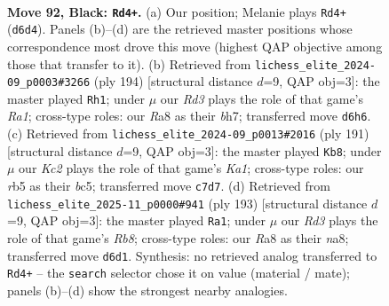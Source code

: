 \documentclass[11pt]{article}
\begin{document}
\clearpage

\begin{figure}[p]\centering
\begin{subfigure}{0.46\textwidth}\centering
\resizebox{\linewidth}{!}{%
\newchessgame
\chessboard[
  setfen={r7/2k5/3r4/1R6/6KP/8/8/8 b - - 26 92},
  showmover=false,
  pgfstyle=straightmove, color=movearrow, markmove={d6-d4}
]}
\caption{}
\end{subfigure}\hfill
\begin{subfigure}{0.46\textwidth}\centering
\resizebox{\linewidth}{!}{%
\newchessgame
\chessboard[
  setfen={8/7b/8/4k3/2r5/8/1K6/R7 w - - 94 98},
  showmover=false,
  pgfstyle=straightmove, color=movearrow, markmove={a1-h1}
]}
\caption{}
\end{subfigure}
\\[4pt]
\begin{subfigure}{0.46\textwidth}\centering
\resizebox{\linewidth}{!}{%
\newchessgame
\chessboard[
  setfen={k7/1r6/8/2BK4/8/8/6R1/8 b - - 79 96},
  showmover=false,
  pgfstyle=straightmove, color=movearrow, markmove={a8-b8}
]}
\caption{}
\end{subfigure}\hfill
\begin{subfigure}{0.46\textwidth}\centering
\resizebox{\linewidth}{!}{%
\newchessgame
\chessboard[
  setfen={N7/8/2K5/8/8/7R/2k5/1r6 b - - 36 97},
  showmover=false,
  pgfstyle=straightmove, color=movearrow, markmove={b1-a1}
]}
\caption{}
\end{subfigure}
\caption{\textbf{Move 92, Black: \texttt{Rd4+}.} (a) Our position; Melanie plays \texttt{Rd4+} (\texttt{d6d4}). Panels (b)--(d) are the retrieved master positions whose correspondence most drove this move (highest QAP objective among those that transfer to it). (b) Retrieved from \texttt{lichess\_elite\_2024-09\_p0003\#3266} (ply 194) [structural distance $d$=9, QAP obj=3]: the master played \texttt{Rh1}; under $\mu$ our \emph{Rd3} plays the role of that game's \emph{Ra1}; cross-type roles: our \emph{R}a8 as their \emph{b}h7; transferred move \texttt{d6h6}. (c) Retrieved from \texttt{lichess\_elite\_2024-09\_p0013\#2016} (ply 191) [structural distance $d$=9, QAP obj=3]: the master played \texttt{Kb8}; under $\mu$ our \emph{Kc2} plays the role of that game's \emph{Ka1}; cross-type roles: our \emph{r}b5 as their \emph{b}c5; transferred move \texttt{c7d7}. (d) Retrieved from \texttt{lichess\_elite\_2025-11\_p0000\#941} (ply 193) [structural distance $d$=9, QAP obj=3]: the master played \texttt{Ra1}; under $\mu$ our \emph{Rd3} plays the role of that game's \emph{Rb8}; cross-type roles: our \emph{R}a8 as their \emph{n}a8; transferred move \texttt{d6d1}. Synthesis: no retrieved analog transferred to \texttt{Rd4+} -- the \texttt{search} selector chose it on value (material / mate); panels (b)--(d) show the strongest nearby analogies.}
\label{fig:thought-m183}
\end{figure}
\end{document}
